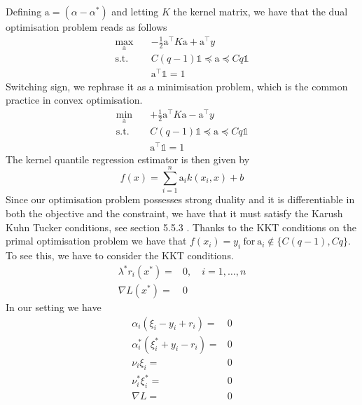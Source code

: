 Defining $\textrm{a}=(\alpha-\alpha^*)$ and letting $K$ the kernel matrix, we have that the dual optimisation problem reads as follows
\begin{equation}\label{eq:kqr_min6}
    \begin{aligned}
        \max_{\textrm{a}} \quad & -\frac{1}{2}\textrm{a}^\intercal K\textrm{a}+\textrm{a}^\intercal y\\
    \textrm{s.t.} \quad & 
    C(q-1)\mathbb{1}\preceq \textrm{a}\preceq Cq\mathbb{1}\\
    &\textrm{a}^\intercal\mathbb{1}=1
    \end{aligned}
    \end{equation}
Switching sign, we rephrase it as a minimisation problem, which is the common practice in convex optimisation.
\begin{equation}\label{eq:kqr_min7}
    \begin{aligned}
        \min_{\textrm{a}} \quad & +\frac{1}{2}\textrm{a}^\intercal K\textrm{a}-\textrm{a}^\intercal y\\
    \textrm{s.t.} \quad & 
    C(q-1)\mathbb{1}\preceq \textrm{a} \preceq Cq\mathbb{1}\\
    &\textrm{a}^\intercal\mathbb{1}=1
    \end{aligned}
    \end{equation}
The kernel quantile regression estimator is then given by
\begin{equation}
    f(x)=\sum\limits_{i=1}^{n} \textrm{a}_i k(x_i, x)+b
\end{equation}
Since our optimisation problem possesses strong duality and it is differentiable in both the objective and the constraint, we have that it must satisfy the Karush Kuhn Tucker conditions, see section 5.5.3 \cite{boyd2004convex}.
Thanks to the KKT conditions on the primal optimisation problem we have that $f(x_i)=y_i \ \mathrm{for} \ \textrm{a}_i \not \in \{C(q-1), Cq\}$. 
To see this, we have to consider the KKT conditions.
\begin{equation}
    \begin{aligned}
    \lambda^* r_i(x^*)=&0, \quad i=1,\dots,n
    \\
    \nabla L(x^*)=&0
\end{aligned}
\end{equation}
In our setting we have
\begin{equation}
    \begin{aligned}
        \alpha_i(\xi_i-y_i+r_i)=&0
        \\
        \alpha_i^*(\xi_i^*+y_i-r_i)=&0
        \\
        \nu_i \xi_i=&0
        \\
        \nu_i^* \xi_i^*=&0
        \\
        \nabla L =&0
    \end{aligned}
\end{equation}
